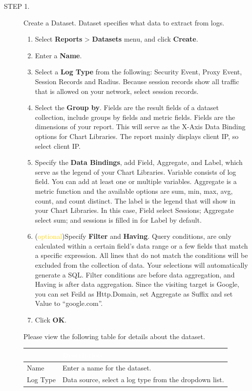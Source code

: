 \begin{description}
    \item[STEP 1.]	Create a Dataset. Dataset specifies what data to extract from logs.
    \begin{enumerate}
        \item Select \textbf{Reports} > \textbf{Datasets} menu, and click \textbf{Create}.
        \item Enter a \textbf{Name}.
        \item Select a \textbf{Log Type} from the following: Security Event, Proxy Event, Session Records and Radius. 
        Because session records show all traffic that is allowed on your network, select session records.
        \item Select the \textbf{Group by}. Fields are the result fields of a dataset collection, include groups by fields and metric fields. 
        Fields are the dimensions of your report. This will serve as the X-Axis Data Binding options for Chart Libraries. The report mainly displays client IP, so select client IP.
        \item Specify the \textbf{Data Bindings}, add Field, Aggregate, and Label, which serve as the legend of your Chart Libraries. Variable consists of log field. 
        You can add at least one or multiple variables. Aggregate is a metric function and the available options are sum, min, max, avg, count, and count distinct. 
        The label is the legend that will show in your Chart Libraries. In this case, Field select Sessions; Aggregate select sum; and sessions is filled in for Label by default.
        \item (\textcolor{gold}{optional})Specify \textbf{Filter} and \textbf{Having}. Query conditions, are only calculated within a certain field's data range or a few fields that match a specific expression. 
        All lines that do not match the conditions will be excluded from the collection of data. Your selections will automatically generate a SQL. 
        Filter conditions are before data aggregation, and Having is after data aggregation. Since the visiting target is Google, you can set Feild as Http.Domain, set Aggregate as Suffix and set Value to “google.com”. 
        \item Click \textbf{OK}.
    \end{enumerate}    

    \item[]Please view the following table for details about the dataset.

        \begin{longtable}{p{}|p{}}   
                \rowcolor{black}\multicolumn{1}{l!\vlinewhite}{\textcolor{white}{Field}}  & \textcolor{white}{Description} \\\hline                                                                                                                                                          
                Name & Enter a name for the dataset.\\\hline  
                Log Type & Data source, select a log type from the dropdown list. 
                            

\end{longtable}
\end{description}
